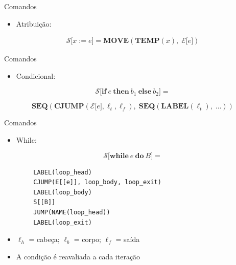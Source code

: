 \begin{frame}{Comandos}

    \begin{itemize}

        \item
        Atribuição:
    \end{itemize}

    \[\begin{array}{c}
    \mathcal{S}\lbrack x := e \rbrack = \mathbf{MOVE}(\mathbf{TEMP}(x),\; \mathcal{E}\lbrack e \rbrack)
\end{array}\]
\end{frame}

\begin{frame}{Comandos}

    \begin{itemize}

        \item
        Condicional:
    \end{itemize}

    \[\mathcal{S}\lbrack \mathbf{if}\ e\ \mathbf{then}\ b_1\ \mathbf{else}\ b_2 \rbrack =\]

    \[\mathbf{SEQ}(\mathbf{CJUMP}(\mathcal{E}\lbrack e \rbrack, \ell_t, \ell_f),\; \mathbf{SEQ}(\mathbf{LABEL}(\ell_t),\; \ldots))\]
\end{frame}

\begin{frame}[fragile]{Comandos}

    \begin{itemize}

        \item
        While:
    \end{itemize}

    \[\mathcal{S}\lbrack \mathbf{while}\ e\ \mathbf{do}\ B \rbrack =\]

    \begin{lstlisting}
        LABEL(loop_head)
        CJUMP(E[[e]], loop_body, loop_exit)
        LABEL(loop_body)
        S[[B]]
        JUMP(NAME(loop_head))
        LABEL(loop_exit)
    \end{lstlisting}

    \begin{itemize}

        \item
        \(\ell_h\) = cabeça; \(\ell_b\) = corpo; \(\ell_f\) = saída
        \item
        A condição é reavaliada a cada iteração
    \end{itemize}
\end{frame}

